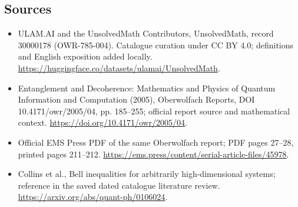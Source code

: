 \documentclass[11pt]{article}
\begin{document}
\subsection{Sources}
\begin{itemize}
\item[\hypertarget{source:30000178:1}{S1}] ULAM.AI and the UnsolvedMath Contributors, UnsolvedMath, record 30000178 (OWR-785-004). Catalogue curation under CC BY 4.0; definitions and English exposition added locally.
\url{https://huggingface.co/datasets/ulamai/UnsolvedMath}.
\item[\hypertarget{source:30000178:2}{S2}] Entanglement and Decoherence: Mathematics and Physics of Quantum Information and Computation (2005), Oberwolfach Reports, DOI 10.4171/owr/2005/04, pp. 185--255; official report source and mathematical context.
\url{https://doi.org/10.4171/owr/2005/04}.
\item[\hypertarget{source:30000178:3}{S3}] Official EMS Press PDF of the same Oberwolfach report; PDF pages 27--28, printed pages 211--212.
\url{https://ems.press/content/serial-article-files/45978}.
\item[\hypertarget{source:30000178:4}{S4}] Collins et al., Bell inequalities for arbitrarily high-dimensional systems; reference in the saved dated catalogue literature review.
\url{https://arxiv.org/abs/quant-ph/0106024}.
\end{itemize}
\label{end:30000178}
\end{document}
